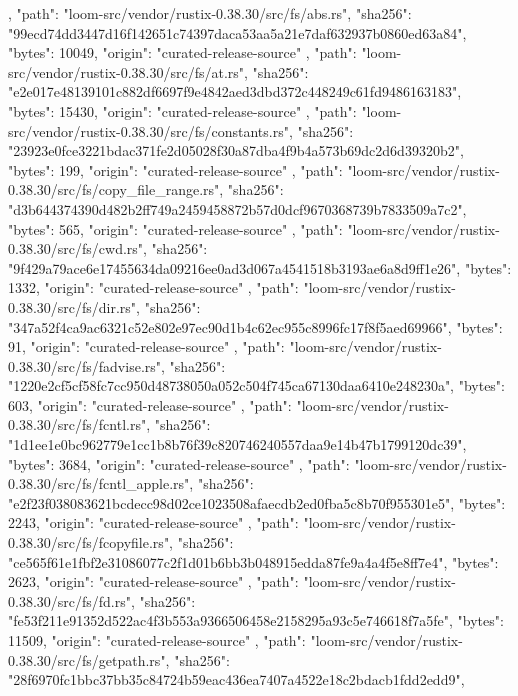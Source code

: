 {{    },
    {
      "path": "loom-src/vendor/rustix-0.38.30/src/fs/abs.rs",
      "sha256": "99ecd74dd3447d16f142651c74397daca53aa5a21e7daf632937b0860ed63a84",
      "bytes": 10049,
      "origin": "curated-release-source"
    },
    {
      "path": "loom-src/vendor/rustix-0.38.30/src/fs/at.rs",
      "sha256": "e2e017e48139101c882df6697f9e4842aed3dbd372c448249c61fd9486163183",
      "bytes": 15430,
      "origin": "curated-release-source"
    },
    {
      "path": "loom-src/vendor/rustix-0.38.30/src/fs/constants.rs",
      "sha256": "23923e0fce3221bdac371fe2d05028f30a87dba4f9b4a573b69dc2d6d39320b2",
      "bytes": 199,
      "origin": "curated-release-source"
    },
    {
      "path": "loom-src/vendor/rustix-0.38.30/src/fs/copy_file_range.rs",
      "sha256": "d3b644374390d482b2ff749a2459458872b57d0dcf9670368739b7833509a7c2",
      "bytes": 565,
      "origin": "curated-release-source"
    },
    {
      "path": "loom-src/vendor/rustix-0.38.30/src/fs/cwd.rs",
      "sha256": "9f429a79ace6e17455634da09216ee0ad3d067a4541518b3193ae6a8d9ff1e26",
      "bytes": 1332,
      "origin": "curated-release-source"
    },
    {
      "path": "loom-src/vendor/rustix-0.38.30/src/fs/dir.rs",
      "sha256": "347a52f4ca9ac6321c52e802e97ec90d1b4c62ec955c8996fc17f8f5aed69966",
      "bytes": 91,
      "origin": "curated-release-source"
    },
    {
      "path": "loom-src/vendor/rustix-0.38.30/src/fs/fadvise.rs",
      "sha256": "1220e2cf5cf58fc7cc950d48738050a052c504f745ca67130daa6410e248230a",
      "bytes": 603,
      "origin": "curated-release-source"
    },
    {
      "path": "loom-src/vendor/rustix-0.38.30/src/fs/fcntl.rs",
      "sha256": "1d1ee1e0bc962779e1cc1b8b76f39c820746240557daa9e14b47b1799120dc39",
      "bytes": 3684,
      "origin": "curated-release-source"
    },
    {
      "path": "loom-src/vendor/rustix-0.38.30/src/fs/fcntl_apple.rs",
      "sha256": "e2f23f038083621bcdecc98d02ce1023508afaecdb2ed0fba5c8b70f955301e5",
      "bytes": 2243,
      "origin": "curated-release-source"
    },
    {
      "path": "loom-src/vendor/rustix-0.38.30/src/fs/fcopyfile.rs",
      "sha256": "ce565f61e1fbf2e31086077c2f1d01b6bb3b048915edda87fe9a4a4f5e8ff7e4",
      "bytes": 2623,
      "origin": "curated-release-source"
    },
    {
      "path": "loom-src/vendor/rustix-0.38.30/src/fs/fd.rs",
      "sha256": "fe53f211e91352d522ac4f3b553a9366506458e2158295a93c5e746618f7a5fe",
      "bytes": 11509,
      "origin": "curated-release-source"
    },
    {
      "path": "loom-src/vendor/rustix-0.38.30/src/fs/getpath.rs",
      "sha256": "28f6970fc1bbc37bb35c84724b59eac436ea7407a4522e18c2bdacb1fdd2edd9",
}}
